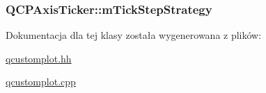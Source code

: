 \subsubsection[{\texorpdfstring{m\+Tick\+Step\+Strategy}{mTickStepStrategy}}]{ Q\+C\+P\+Axis\+Ticker\+::m\+Tick\+Step\+Strategy\hspace{0.3cm}{\ttfamily [protected]}}\hypertarget{class_q_c_p_axis_ticker_ac059d6d670b2f6132c593fb4de156701}{}\label{class_q_c_p_axis_ticker_ac059d6d670b2f6132c593fb4de156701}


Dokumentacja dla tej klasy została wygenerowana z plików\+:\begin{DoxyCompactItemize}
\item 
\hyperlink{qcustomplot_8hh}{qcustomplot.\+hh}\item 
\hyperlink{qcustomplot_8cpp}{qcustomplot.\+cpp}\end{DoxyCompactItemize}
